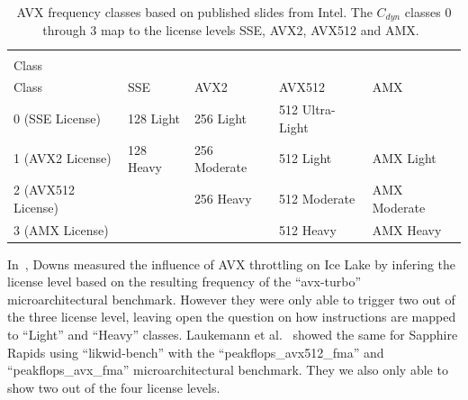 
\begin{table}[t]
	\centering
	\caption{\label{tab:avx-classes}AVX frequency classes based on published slides from Intel.
    The $C_{dyn}$ classes 0 through 3 map to the license levels SSE, AVX2, AVX512 and AMX.~\cite{ServeTheHome_Emerald_Rapids_2023}}
    \begin{tabular}{|l|p{}|p{}|p{}|p{}|}
        \hline
        \diagbox[width=0.24\textwidth]{$C_{dyn}$\\Class}{Instruction\\Class} & SSE & AVX2 & AVX512 & AMX \\
        \hline
        0 (SSE License) & 128 Light & 256 Light & 512 Ultra-Light & \\
        \hline
        1 (AVX2 License) & 128 Heavy & 256 Moderate & 512 Light & AMX Light \\
        \hline
        2 (AVX512 License) & & 256 Heavy & 512 Moderate & AMX Moderate \\
        \hline
        3 (AMX License) & & & 512 Heavy & AMX Heavy \\
        \hline
	\end{tabular}
\end{table}

In~\cite{Downs_2020_AVX_Downclocking}, Downs measured the influence of AVX throttling on Ice Lake by infering the license level based on the resulting frequency of the ``avx-turbo'' microarchitectural benchmark.
However they were only able to trigger two out of the three license level, leaving open the question on how instructions are mapped to ``Light'' and ``Heavy'' classes.
Laukemann et al.~\cite{laukemann_microarchitectural_2024} showed the same for Sapphire Rapids using ``likwid-bench'' with the ``peakflops\_avx512\_fma'' and ``peakflops\_avx\_fma'' microarchitectural benchmark.
They we also only able to show two out of the four license levels.

